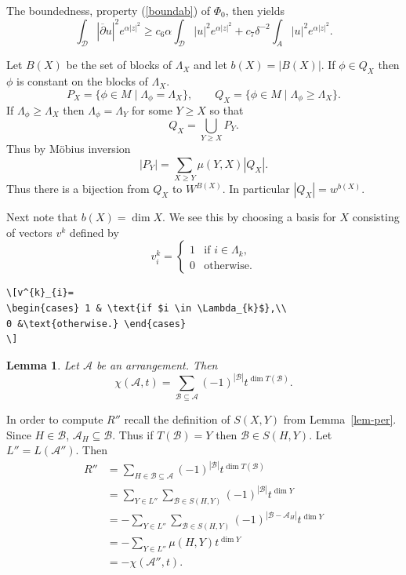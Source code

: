 \documentclass[manuscript, printscheme]{aomart}
\newtheorem[{}\it]{thm}{Theorem}[section]
\newtheorem{lem}[thm]{Lemma}
\theoremstyle{definition}
\newtheorem*[{}\it]{notation}{Notation}
\newcommand{\lemref}[1]{Lemma~\ref{#1}}
\newcommand{\A}{\mathcal{A}}
\newcommand{\B}{\mathcal{B}}
\newcommand{\envert}[1]{\left\lvert#1\right\rvert}
\let\abs=\envert
\begin{document}
The boundedness, property (\ref{boundab}) of $\Phi_ 0$, then yields
\[\int_{\mathcal{D}}\abs{\overline\partial u}^2e^{\alpha\abs{z}^2}\geq c_6\alpha
\int_{\mathcal{D}}\abs{u}^2e^{\alpha\abs{z}^2}
+c_7\delta^{-2}\int_ A\abs{u}^2e^{\alpha\abs{z}^2}.\]

Let $B(X)$ be the set of blocks of $\Lambda_{X}$
and let $b(X) = \abs{B(X)}$. If $\phi \in Q_{X}$ then
$\phi$ is constant on the blocks of $\Lambda_{X}$.
\begin{equation}\label{far-d}
 P_{X} = \{ \phi \in M \mid \Lambda_{\phi} = \Lambda_{X} \},
\qquad
Q_{X} = \{\phi \in M \mid \Lambda_{\phi} \geq \Lambda_{X} \}.
\end{equation}
If $\Lambda_{\phi} \geq \Lambda_{X}$ then
$\Lambda_{\phi} = \Lambda_{Y}$ for some $Y \geq X$ so that
\[ Q_{X} = \bigcup_{Y \geq X} P_{Y}. \]
Thus by M\"obius inversion
\[ \abs{P_{Y}}= \sum_{X\geq Y} \mu (Y,X)\abs{Q_{X}}.\]
Thus there is a bijection from $Q_{X}$ to $W^{B(X)}$.
In particular $\abs{Q_{X}} = w^{b(X)}$.

Next note that $b(X)=\dim X$. We see this by choosing a
basis for $X$ consisting of vectors $v^{k}$ defined by
\[v^{k}_{i}=
\begin{cases} 1 & \text{if $i \in \Lambda_{k}$},\\
0 &\text{otherwise.} \end{cases}
\]
\begin{verbatim}
\[v^{k}_{i}=
\begin{cases} 1 & \text{if $i \in \Lambda_{k}$},\\
0 &\text{otherwise.} \end{cases}
\]
\end{verbatim}

\begin{lem}\label{p0201}
Let $\A$ be an arrangement. Then
\[ \chi (\A,t) = \sum_{\B \subseteq \A}
(-1)^{\abs{\B}} t^{\dim T(\B)}. \]
\end{lem}

In order to compute $R''$ recall the definition
of $S(X,Y)$ from \lemref{lem-per}. Since $H \in \B$,
$\A_{H} \subseteq \B$. Thus if $T(\B) = Y$ then
$\B \in S(H,Y)$. Let $L'' = L(\A'')$. Then
\begin{equation}\label{E_SXgYy}
\begin{split}
R''&= \sum_{H\in \B \subseteq \A} (-1)^{\abs{\B}}
t^{\dim T(\B)}\\
&= \sum_{Y \in L''} \sum_{\B \in S(H,Y)}
(-1)^{\abs{\B}}t^{\dim Y} \\
&= -\sum_{Y \in L''} \sum_{\B \in S(H,Y)} (-1)^
{\abs{\B - \A_{H}}} t^{\dim Y} \\
&= -\sum_{Y \in L''} \mu (H,Y)t^{\dim Y} \\
&= -\chi (\A '',t).
\end{split}
\end{equation}
\end{document}
